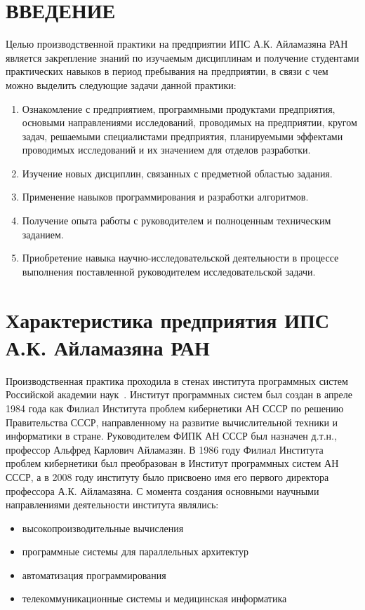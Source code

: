 \documentclass[14pt, russian]{scrartcl}
\newcommand{\anonsection}[1]{\cleardoublepage
\phantomsection
\addcontentsline{toc}{section}{\protect\numberline{}#1}
\section*{#1}\vspace*{2.5ex} %
}
\begin{document}

\setlength{\tabcolsep}{3pt}
\newpage
\setcounter{page}{2}


\newpage
\renewcommand\contentsname{\hfill{\normalfont{СОДЕРЖАНИЕ}}\hfill}  %
\tableofcontents
\newpage

\anonsection{ВВЕДЕНИЕ}  %
Целью производственной практики на предприятии ИПС А.К. Айламазяна РАН является закрепление знаний по изучаемым дисциплинам 
и получение студентами практических навыков в период пребывания на предприятии, 
в связи с чем можно выделить следующие задачи данной практики:

\begin{enumerate}
  \item Ознакомление с предприятием, программными продуктами предприятия, основыми направлениями исследований, проводимых на предприятии, кругом задач, решаемыми специалистами предприятия, планируемыми эффектами проводимых исследований и их значением для отделов разработки.
  \item Изучение новых дисциплин, связанных с предметной областью задания.
  \item Применение навыков программирования и разработки алгоритмов. 
  \item Получение опыта работы с руководителем и полноценным техническим заданием.
  \item Приобретение навыка научно-исследовательской деятельности в процессе выполнения поставленной руководителем исследовательской задачи.
\end{enumerate}

\section{Характеристика предприятия ИПС А.К. Айламазяна РАН}
Производственная практика проходила в стенах института программных систем Российской академии наук~\cite{IPS}.
Институт программных систем  был создан в апреле 1984 года как Филиал Института проблем кибернетики АН СССР по решению Правительства СССР, направленному на развитие вычислительной техники и информатики в стране. Руководителем ФИПК АН СССР был назначен д.т.н., профессор Альфред Карлович Айламазян. В 1986 году Филиал Института проблем кибернетики был преобразован в Институт программных систем АН СССР, а в 2008 году институту было присвоено имя его первого директора профессора А.К. Айламазяна.
С момента создания основными научными направлениями деятельности  института являлись:
\begin{itemize}
\item высокопроизводительные вычисления
\item программные системы для параллельных архитектур
\item автоматизация программирования
\item телекоммуникационные системы и медицинская информатика
\end{itemize}
\end{document}
